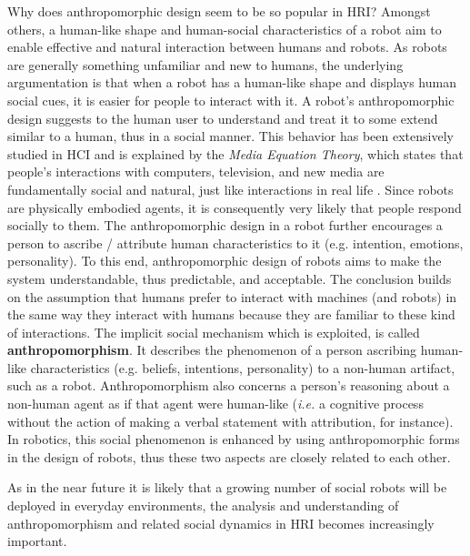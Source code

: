 \documentclass[twocolumn]{svjour3}          %
\begin{document}
	Why does anthropomorphic design seem to be so popular in HRI? Amongst others, a human-like shape and human-social characteristics of a robot aim to enable effective and natural interaction between humans and robots. As robots are generally something unfamiliar and new to humans, the underlying argumentation is that when a robot has a human-like shape and displays human social cues, it is easier for people to interact with it. A robot's anthropomorphic design suggests to the human user to understand and treat it to some extend similar to a human, thus in a social manner. This behavior has been extensively studied in HCI and is explained by the \emph{Media Equation Theory}, which states that people's interactions with computers, television, and new media are fundamentally social and natural, just like interactions in real life \cite{reeves_media_1996}. Since robots are physically embodied agents, it is consequently very likely that people respond socially to them. The anthropomorphic design in a robot further encourages a person to ascribe / attribute human characteristics to it (e.g. intention, emotions, personality). To this end, anthropomorphic design of robots aims to make the system understandable, thus predictable, and acceptable. The conclusion builds on the assumption that humans prefer to interact with machines (and robots) in the same way they interact with humans \cite{fong_survey_2003} because they are familiar to these kind of interactions. The implicit social mechanism which is exploited, is called \textbf{anthropomorphism}. It describes the phenomenon of a person ascribing human-like characteristics (e.g. beliefs, intentions, personality) to a non-human artifact, such as a robot. Anthropomorphism also concerns a person's reasoning about a non-human agent as if that agent were human-like (\textit{i.e.} a cognitive process without the action of making a verbal statement with attribution, for instance). In robotics, this social phenomenon is enhanced by using anthropomorphic forms in the design of robots, thus these two aspects are closely related to each other. 
	
	As in the near future it is likely that a growing number of social robots will be deployed in everyday environments, the analysis and understanding of anthropomorphism and related social dynamics in HRI becomes increasingly important.
	
%
%
%
%
%
%
\end{document}
